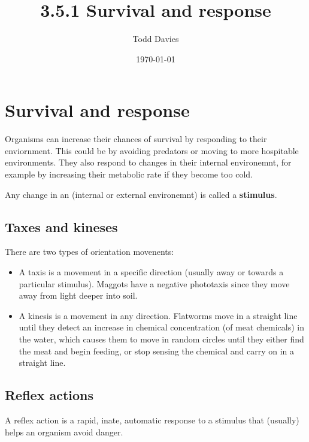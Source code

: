 \documentclass{article}
\title{3.5.1 Survival and response}
\author{Todd Davies}
\date{\today}
\begin{document}
\lhead{\today}

\maketitle

\section*{Survival and response}
\thispagestyle{empty}

Organisms can increase their chances of survival by responding to their
enviornment. This could be by avoiding predators or moving to more hospitable
environments. They also respond to changes in their internal environemnt, for
example by increasing their metabolic rate if they become too cold. 

Any change in an (internal or external environemnt) is called a {\bf stimulus}.

\subsection*{Taxes and kineses}

There are two types of orientation movenents:

\begin{itemize}

	\item A taxis is a movement in a specific direction (usually away or towards
	a particular stimulus). Maggots have a negative phototaxis since they move
	away from light deeper into soil.

	\item A kinesis is a movement in any direction. Flatworms move in a straight
	line until they detect an increase in chemical concentration (of meat
	chemicals) in the water, which causes them to move in random circles until
	they either find the meat and begin feeding, or stop sensing the chemical
	and carry on in a straight line.

\end{itemize}

\subsection*{Reflex actions}

A reflex action is a rapid, inate, automatic response to a stimulus that
(usually) helps an organism avoid danger.
\end{document}
